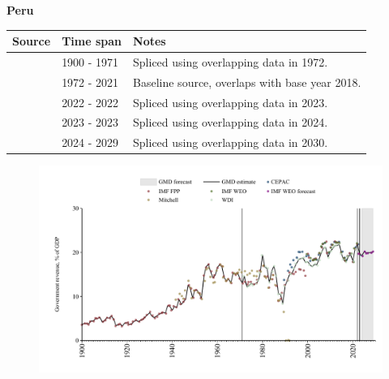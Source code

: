 \documentclass[12pt,a4paper,landscape]{article}
\begin{document}
\begin{adjustbox}{max totalsize={\paperwidth}{\paperheight},center}
\begin{minipage}[t][\textheight][t]{\textwidth}
\vspace*{0.5cm}
{}
\begin{center}
{\Large\bfseries Peru}
\end{center}
\vspace{0.5cm}
\begin{table}[H]
\centering
\small
\begin{tabular}{|l|l|l|}
\hline
\textbf{Source} & \textbf{Time span} & \textbf{Notes} \\
\hline
\rowcolor{white}\cite{IMF_FPP}& 1900 - 1971 &Spliced using overlapping data in 1972.\\
\rowcolor{lightgray}\cite{WDI}& 1972 - 2021 &Baseline source, overlaps with base year 2018.\\
\rowcolor{white}\cite{IMF_WEO}& 2022 - 2022 &Spliced using overlapping data in 2023.\\
\rowcolor{lightgray}\cite{CEPAC}& 2023 - 2023 &Spliced using overlapping data in 2024.\\
\rowcolor{white}\cite{IMF_WEO_forecast}& 2024 - 2029 &Spliced using overlapping data in 2030.\\
\hline
\end{tabular}
\end{table}
\begin{figure}[H]
\centering
\includegraphics[width=\textwidth,height=0.6\textheight,keepaspectratio]{graphs/PER_govrev_GDP.pdf}
\end{figure}
\end{minipage}
\end{adjustbox}
\end{document}
